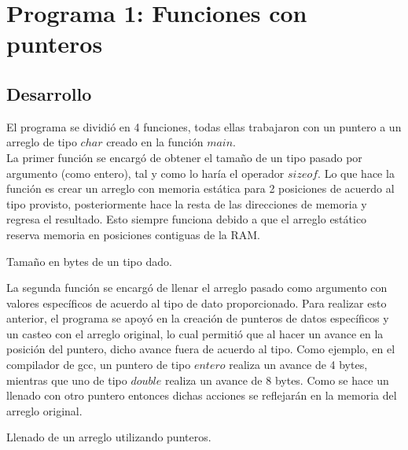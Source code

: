 \documentclass[12pt]{article}
\begin{document}
\section{Programa 1: Funciones con punteros}
\subsection{Desarrollo}
El programa se dividió en 4 funciones, todas ellas trabajaron con un puntero a un arreglo de tipo $char$ creado en la función $main$.\\

La primer función se encargó de obtener el tamaño de un tipo pasado por argumento (como entero), tal y como lo haría el operador $sizeof$. Lo que hace la función es crear un arreglo con memoria estática para 2 posiciones de acuerdo al tipo provisto, posteriormente hace la resta de las direcciones de memoria y regresa el resultado. Esto siempre funciona debido a que el arreglo estático reserva memoria en posiciones contiguas de la RAM.\\

\begin{algorithm}[H]
\caption{Tamaño en bytes de un tipo dado.}
\end{algorithm}

La segunda función se encargó de llenar el arreglo pasado como argumento con valores específicos de acuerdo al tipo de dato proporcionado. Para realizar esto anterior, el programa se apoyó en la creación de punteros de datos específicos y un casteo con el arreglo original, lo cual permitió que al hacer un avance en la posición del puntero, dicho avance fuera de acuerdo al tipo. Como ejemplo, en el compilador de gcc, un puntero de tipo $entero$ realiza un avance de 4 bytes, mientras que uno de tipo $double$ realiza un avance de 8 bytes. Como se hace un llenado con otro puntero entonces dichas acciones se reflejarán en la memoria del arreglo original.

\begin{algorithm}[H]
	\caption{Llenado de un arreglo utilizando punteros.}
\end{algorithm}
\end{document}

